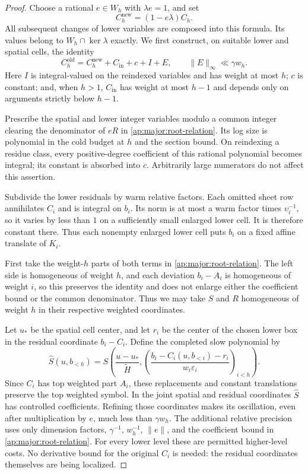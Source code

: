 \begin{proof}
Choose a rational $e\in W_h$ with $\lambda e=1$, and set
\[
                   C_h^{\mathrm{new}}=(1-e\lambda)C_h.
\]
All subsequent changes of lower variables are composed into this
formula.  Its values belong to $W_h\cap\ker\lambda$ exactly.
We first construct, on suitable lower and spatial cells, the identity
\begin{equation}\label{ap:major:cut-identity}
 C_h^{\mathrm{old}}=
 C_h^{\mathrm{new}}+C_{\mathrm{in}}+c+I+E,
                     \qquad \|E\|_\infty\ll\gamma w_h.
\end{equation}
Here $I$ is integral-valued on the reindexed variables and has
weight at most $h$; $c$ is constant; and, when $h>1$,
$C_{\mathrm{in}}$ has weight at most $h-1$ and depends only on
arguments strictly below $h-1$.

Prescribe the spatial and lower integer variables modulo a common
integer clearing the denominator of $eR$ in
\eqref{ap:major:root-relation}.  Its log size is polynomial in the
cold budget at $h$ and the section bound.  On reindexing a residue
class, every positive-degree coefficient of this rational polynomial
becomes integral; its constant is absorbed into $c$.  Arbitrarily
large numerators do not affect this assertion.

Subdivide the lower residuals by warm relative factors.  Each omitted
sheet row annihilates $C_i$ and is integral on $b_i$.  Its norm is
at most a warm factor times $\upsilon_i^{-1}$, so it varies by less than
$1$ on a sufficiently small enlarged lower cell.  It is therefore
constant there.  Thus each nonempty enlarged lower cell puts $b_i$
on a fixed affine translate of $K_i$.

First take the weight-$h$ parts of both terms in
\eqref{ap:major:root-relation}. The left side is homogeneous of
weight $h$, and each deviation $b_i-A_i$ is homogeneous of weight
$i$, so this preserves the identity and does not enlarge either
the coefficient bound or the common denominator. Thus we may
take $S$ and $R$ homogeneous of weight $h$ in their respective
weighted coordinates.

Let $u_*$ be the spatial cell center, and let $r_i$ be the center
of the chosen lower box in the residual coordinate $b_i-C_i$.
Define the completed slow polynomial by
\[
 \widehat S(u,b_{<h})=
 S\left(\frac{u-u_*}{\widetilde H},
   \left(\frac{b_i-C_i(u,b_{<i})-r_i}
                   {w_i\varepsilon_i}\right)_{i<h}\right).
\]
Since $C_i$ has top weighted part $A_i$, these replacements and
constant translations preserve the top weighted symbol. In the
joint spatial and residual coordinates $\widehat S$ has controlled
coefficients. Refining those coordinates
makes its oscillation, even after multiplication by $e$, much less
than $\gamma w_h$.  The additional relative precision uses only
dimension factors, $\gamma^{-1}$, $w_h^{-1}$, $\|e\|$, and the
coefficient bound in \eqref{ap:major:root-relation}.  For every lower
level these are permitted higher-level costs.  No derivative bound
for the original $C_i$ is needed: the residual coordinates themselves
are being localized.


\end{proof}
